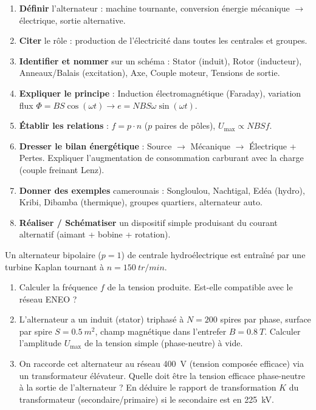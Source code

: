 \documentclass[11pt]{article}
\begin{document}
\begin{aretenir}
\begin{enumerate}
\item \textbf{Définir} l'alternateur : machine tournante, conversion énergie mécanique $\to$ électrique, sortie alternative.
\item \textbf{Citer} le rôle : production de l'électricité dans toutes les centrales et groupes.
\item \textbf{Identifier et nommer} sur un schéma : Stator (induit), Rotor (inducteur), Anneaux/Balais (excitation), Axe, Couple moteur, Tensions de sortie.
\item \textbf{Expliquer le principe} : Induction électromagnétique (Faraday), variation flux $\Phi = B S \cos(\omega t) \to e = N B S \omega \sin(\omega t)$.
\item \textbf{Établir les relations} : $f = p \cdot n$ ($p$ paires de pôles), $U_{\max} \propto N B S f$.
\item \textbf{Dresser le bilan énergétique} : Source $\to$ Mécanique $\to$ Électrique + Pertes. Expliquer l'augmentation de consommation carburant avec la charge (couple freinant Lenz).
\item \textbf{Donner des exemples} camerounais : Songloulou, Nachtigal, Edéa (hydro), Kribi, Dibamba (thermique), groupes quartiers, alternateur auto.
\item \textbf{Réaliser / Schématiser} un dispositif simple produisant du courant alternatif (aimant + bobine + rotation).
\end{enumerate}
\end{aretenir}

\begin{exercice}
Un alternateur bipolaire ($p=1$) de centrale hydroélectrique est entraîné par une turbine Kaplan tournant à $n = \SI{150}{tr/min}$.
\begin{enumerate}
\item Calculer la fréquence $f$ de la tension produite. Est-elle compatible avec le réseau ENEO ?
\item L'alternateur a un induit (stator) triphasé à $N = 200$ spires par phase, surface par spire $S = \SI{0.5}{m^2}$, champ magnétique dans l'entrefer $B = \SI{0.8}{T}$. Calculer l'amplitude $U_{\max}$ de la tension simple (phase-neutre) à vide.
\item On raccorde cet alternateur au réseau \SI{400}{V} (tension composée efficace) via un transformateur élévateur. Quelle doit être la tension efficace phase-neutre à la sortie de l'alternateur ? En déduire le rapport de transformation $K$ du transformateur (secondaire/primaire) si le secondaire est en \SI{225}{kV}.
\end{enumerate}
\end{exercice}
\end{document}

